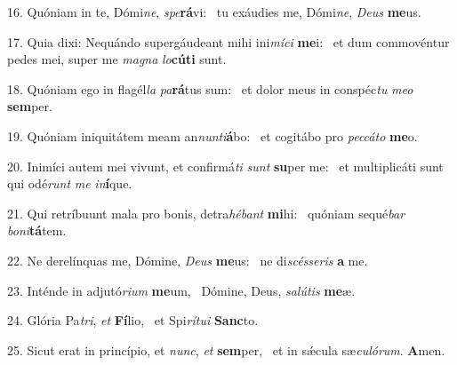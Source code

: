 16. Quóniam in te, Dómi\textit{ne}, \textit{spe}\textbf{rá}vi: \ast\  tu exáudies me, Dómi\textit{ne}, \textit{De}\textit{us} \textbf{me}us.\

17. Quia dixi: Nequándo supergáudeant mihi ini\textit{mí}\textit{ci} \textbf{me}i: \ast\  et dum commovéntur pedes mei, super me \textit{ma}\textit{gna} \textit{lo}\textbf{cú}\textbf{ti} sunt.\

18. Quóniam ego in flagél\textit{la} \textit{pa}\textbf{rá}tus sum: \ast\  et dolor meus in conspéc\textit{tu} \textit{me}\textit{o} \textbf{sem}per.\

19. Quóniam iniquitátem meam an\textit{nun}\textit{ti}\textbf{á}bo: \ast\  et cogitábo pro \textit{pec}\textit{cá}\textit{to} \textbf{me}o.\

20. Inimíci autem mei vivunt, et confirmá\textit{ti} \textit{sunt} \textbf{su}per me: \ast\  et multiplicáti sunt qui odé\textit{runt} \textit{me} \textit{in}\textbf{í}que.\

21. Qui retríbuunt mala pro bonis, detra\textit{hé}\textit{bant} \textbf{mi}hi: \ast\  quóniam sequé\textit{bar} \textit{bo}\textit{ni}\textbf{tá}tem.\

22. Ne derelínquas me, Dómine, \textit{De}\textit{us} \textbf{me}us: \ast\  ne di\textit{scés}\textit{se}\textit{ris} \textbf{a} me.\

23. Inténde in adjutó\textit{ri}\textit{um} \textbf{me}um, \ast\  Dómine, Deus, \textit{sa}\textit{lú}\textit{tis} \textbf{me}æ.\

24. Glória Pa\textit{tri}, \textit{et} \textbf{Fí}lio, \ast\  et Spi\textit{rí}\textit{tu}\textit{i} \textbf{Sanc}to.\

25. Sicut erat in princípio, et \textit{nunc}, \textit{et} \textbf{sem}per, \ast\  et in sǽcula sæ\textit{cu}\textit{ló}\textit{rum}. \textbf{A}men.\

